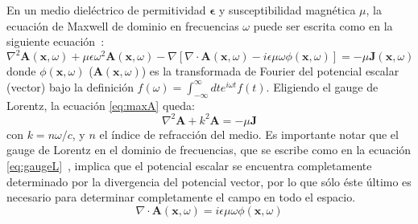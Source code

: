 En un medio diel\'ectrico de permitividad $\mathbf{\epsilon}$ y susceptibilidad magn\'etica $\mu$, la ecuaci\'on de Maxwell de dominio en frecuencias $\omega$ puede ser escrita como en la siguiente ecuaci\'on~\cite{jackson:1998}:
%
\begin{equation}
\nabla^2\mathbf{A}(\mathbf{x},\omega)+\mu\epsilon\omega^2\mathbf{A}(\mathbf{x},\omega)
-\nabla\left[
\nabla\cdot\mathbf{A}(\mathbf{x},\omega)-i\epsilon\mu\omega\phi(\mathbf{x},\omega)
\right]
=
-\mu\mathbf{J}(\mathbf{x},\omega)
\label{eq:maxA}
\end{equation}
%
donde $\phi(\mathbf{x},\omega)$ ($\mathbf{A}(\mathbf{x},\omega)$) es la transformada de Fourier del potencial escalar (vector) bajo la definici\'on $f(\omega)=\int_{-\infty}^\infty dt e^{i\omega t} f(t)$.
Eligiendo el gauge de Lorentz, la ecuaci\'on \ref{eq:maxA} queda:
%
\begin{equation}
\nabla^2\mathbf{A}+k^2\mathbf{A}
=
-\mu\mathbf{J}
\label{eq:maxA2}
\end{equation}
%
con $k=n\omega/c$, y $n$ el \'indice de refracci\'on del medio.
Es importante notar que el gauge de Lorentz en el dominio de frecuencias, que se escribe como en la ecuaci\'on \ref{eq:gaugeL}~\cite{jackson:1998}, implica que el potencial escalar se encuentra completamente determinado por la divergencia del potencial vector, por lo que s\'olo \'este \'ultimo es necesario para determinar completamente el campo en todo el espacio.
%
\begin{equation}
\nabla\cdot\mathbf{A}(\mathbf{x},\omega)=i\epsilon\mu\omega\phi(\mathbf{x},\omega)
\label{eq:gaugeL}
\end{equation}
%

